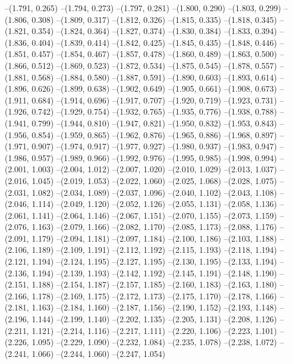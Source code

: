 --(1.791, 0.265)
--(1.794, 0.273)
--(1.797, 0.281)
--(1.800, 0.290)
--(1.803, 0.299)
--(1.806, 0.308)
--(1.809, 0.317)
--(1.812, 0.326)
--(1.815, 0.335)
--(1.818, 0.345)
--(1.821, 0.354)
--(1.824, 0.364)
--(1.827, 0.374)
--(1.830, 0.384)
--(1.833, 0.394)
--(1.836, 0.404)
--(1.839, 0.414)
--(1.842, 0.425)
--(1.845, 0.435)
--(1.848, 0.446)
--(1.851, 0.457)
--(1.854, 0.467)
--(1.857, 0.478)
--(1.860, 0.489)
--(1.863, 0.500)
--(1.866, 0.512)
--(1.869, 0.523)
--(1.872, 0.534)
--(1.875, 0.545)
--(1.878, 0.557)
--(1.881, 0.568)
--(1.884, 0.580)
--(1.887, 0.591)
--(1.890, 0.603)
--(1.893, 0.614)
--(1.896, 0.626)
--(1.899, 0.638)
--(1.902, 0.649)
--(1.905, 0.661)
--(1.908, 0.673)
--(1.911, 0.684)
--(1.914, 0.696)
--(1.917, 0.707)
--(1.920, 0.719)
--(1.923, 0.731)
--(1.926, 0.742)
--(1.929, 0.754)
--(1.932, 0.765)
--(1.935, 0.776)
--(1.938, 0.788)
--(1.941, 0.799)
--(1.944, 0.810)
--(1.947, 0.821)
--(1.950, 0.832)
--(1.953, 0.843)
--(1.956, 0.854)
--(1.959, 0.865)
--(1.962, 0.876)
--(1.965, 0.886)
--(1.968, 0.897)
--(1.971, 0.907)
--(1.974, 0.917)
--(1.977, 0.927)
--(1.980, 0.937)
--(1.983, 0.947)
--(1.986, 0.957)
--(1.989, 0.966)
--(1.992, 0.976)
--(1.995, 0.985)
--(1.998, 0.994)
--(2.001, 1.003)
--(2.004, 1.012)
--(2.007, 1.020)
--(2.010, 1.029)
--(2.013, 1.037)
--(2.016, 1.045)
--(2.019, 1.053)
--(2.022, 1.060)
--(2.025, 1.068)
--(2.028, 1.075)
--(2.031, 1.082)
--(2.034, 1.089)
--(2.037, 1.096)
--(2.040, 1.102)
--(2.043, 1.108)
--(2.046, 1.114)
--(2.049, 1.120)
--(2.052, 1.126)
--(2.055, 1.131)
--(2.058, 1.136)
--(2.061, 1.141)
--(2.064, 1.146)
--(2.067, 1.151)
--(2.070, 1.155)
--(2.073, 1.159)
--(2.076, 1.163)
--(2.079, 1.166)
--(2.082, 1.170)
--(2.085, 1.173)
--(2.088, 1.176)
--(2.091, 1.179)
--(2.094, 1.181)
--(2.097, 1.184)
--(2.100, 1.186)
--(2.103, 1.188)
--(2.106, 1.189)
--(2.109, 1.191)
--(2.112, 1.192)
--(2.115, 1.193)
--(2.118, 1.194)
--(2.121, 1.194)
--(2.124, 1.195)
--(2.127, 1.195)
--(2.130, 1.195)
--(2.133, 1.194)
--(2.136, 1.194)
--(2.139, 1.193)
--(2.142, 1.192)
--(2.145, 1.191)
--(2.148, 1.190)
--(2.151, 1.188)
--(2.154, 1.187)
--(2.157, 1.185)
--(2.160, 1.183)
--(2.163, 1.180)
--(2.166, 1.178)
--(2.169, 1.175)
--(2.172, 1.173)
--(2.175, 1.170)
--(2.178, 1.166)
--(2.181, 1.163)
--(2.184, 1.160)
--(2.187, 1.156)
--(2.190, 1.152)
--(2.193, 1.148)
--(2.196, 1.144)
--(2.199, 1.140)
--(2.202, 1.135)
--(2.205, 1.131)
--(2.208, 1.126)
--(2.211, 1.121)
--(2.214, 1.116)
--(2.217, 1.111)
--(2.220, 1.106)
--(2.223, 1.101)
--(2.226, 1.095)
--(2.229, 1.090)
--(2.232, 1.084)
--(2.235, 1.078)
--(2.238, 1.072)
--(2.241, 1.066)
--(2.244, 1.060)
--(2.247, 1.054)
